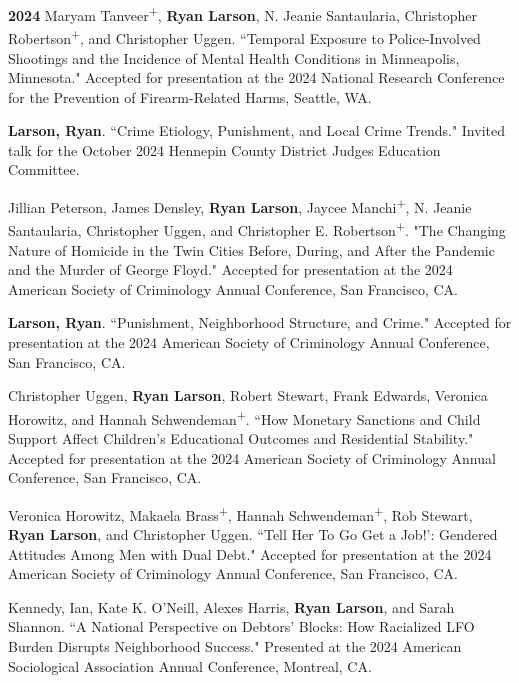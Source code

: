 \documentclass[letterpaper]{article}
\newenvironment{publist}{%
  \begin{list}{}{%
    \setlength{\leftmargin}{0cm}   %
    \setlength{\labelwidth}{2cm}     %
    \setlength{\labelsep}{0.5cm}     %
  }%
}{%
  \end{list}%
}
\begin{document}
\begin{publist}

\item[\textbf{2024}] Maryam Tanveer\textsuperscript{+}, \textbf{Ryan Larson}, N. Jeanie Santaularia, Christopher Robertson\textsuperscript{+}, and Christopher Uggen. ``Temporal Exposure to Police-Involved Shootings and the Incidence of Mental Health Conditions in Minneapolis, Minnesota." Accepted for presentation at the 2024 National Research Conference for the Prevention of Firearm-Related Harms, Seattle, WA. 

\item \textbf{Larson, Ryan}. ``Crime Etiology, Punishment, and Local Crime Trends." Invited talk for the October 2024 Hennepin County District Judges Education Committee.  

\item Jillian Peterson, James Densley, \textbf{Ryan Larson}, Jaycee Manchi\textsuperscript{+}, N. Jeanie Santaularia, Christopher Uggen, and Christopher E. Robertson\textsuperscript{+}. "The Changing Nature of Homicide in the Twin Cities Before, During, and After the Pandemic and the Murder of George Floyd." Accepted for presentation at the 2024 American Society of Criminology Annual Conference, San Francisco, CA. 

\item \textbf{Larson, Ryan}. ``Punishment, Neighborhood Structure, and Crime." Accepted for presentation at the 2024 American Society of Criminology Annual Conference, San Francisco, CA. 

\item Christopher Uggen, \textbf{Ryan Larson}, Robert Stewart, Frank Edwards, Veronica Horowitz, and Hannah Schwendeman\textsuperscript{+}. ``How Monetary Sanctions and Child Support Affect Children's Educational Outcomes and Residential Stability." Accepted for presentation at the 2024 American Society of Criminology Annual Conference, San Francisco, CA. 

\item Veronica Horowitz, Makaela Brass\textsuperscript{+}, Hannah Schwendeman\textsuperscript{+}, Rob Stewart, \textbf{Ryan Larson}, and Christopher Uggen. ``Tell Her To Go Get a Job!': Gendered Attitudes Among Men with Dual Debt." Accepted for presentation at the 2024 American Society of Criminology Annual Conference, San Francisco, CA. 

\item Kennedy, Ian, Kate K. O’Neill, Alexes Harris, \textbf{Ryan Larson}, and Sarah Shannon. ``A National Perspective on Debtors’ Blocks: How Racialized LFO Burden Disrupts Neighborhood Success." Presented at the 2024 American Sociological Association Annual Conference, Montreal, CA. 


\end{publist}
\end{document}
